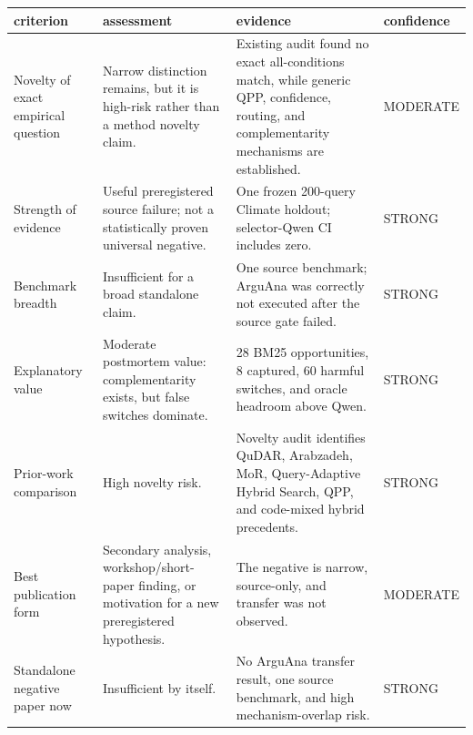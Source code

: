 \begin{tabular}{llll}
\toprule
criterion & assessment & evidence & confidence \\
\midrule
Novelty of exact empirical question & Narrow distinction remains, but it is high-risk rather than a method novelty claim. & Existing audit found no exact all-conditions match, while generic QPP, confidence, routing, and complementarity mechanisms are established. & MODERATE \\
Strength of evidence & Useful preregistered source failure; not a statistically proven universal negative. & One frozen 200-query Climate holdout; selector-Qwen CI includes zero. & STRONG \\
Benchmark breadth & Insufficient for a broad standalone claim. & One source benchmark; ArguAna was correctly not executed after the source gate failed. & STRONG \\
Explanatory value & Moderate postmortem value: complementarity exists, but false switches dominate. & 28 BM25 opportunities, 8 captured, 60 harmful switches, and oracle headroom above Qwen. & STRONG \\
Prior-work comparison & High novelty risk. & Novelty audit identifies QuDAR, Arabzadeh, MoR, Query-Adaptive Hybrid Search, QPP, and code-mixed hybrid precedents. & STRONG \\
Best publication form & Secondary analysis, workshop/short-paper finding, or motivation for a new preregistered hypothesis. & The negative is narrow, source-only, and transfer was not observed. & MODERATE \\
Standalone negative paper now & Insufficient by itself. & No ArguAna transfer result, one source benchmark, and high mechanism-overlap risk. & STRONG \\
\bottomrule
\end{tabular}
